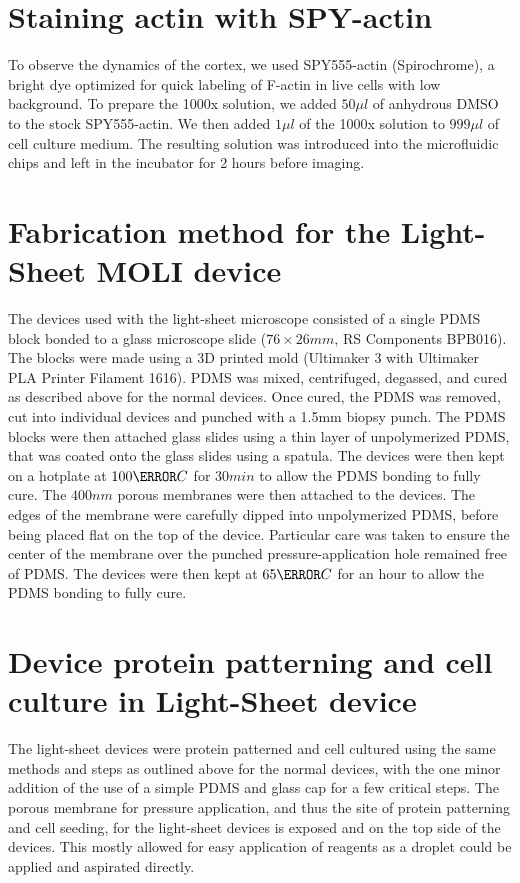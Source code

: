 \section{Staining actin with SPY-actin}

To observe the dynamics of the cortex, we used SPY555-actin (Spirochrome), a bright dye optimized for quick labeling of F-actin in live cells with low background. To prepare the 1000x solution, we added  $50\mu l$ of anhydrous DMSO to the stock SPY555-actin. We then added $1 \mu l$ of the 1000x solution to $999\mu l$ of cell culture medium. The resulting solution was introduced into the microfluidic chips and left in the incubator for 2 hours before imaging.

\section{Fabrication method for the Light-Sheet MOLI device }

The devices used with the light-sheet microscope consisted of a single PDMS block bonded to a glass microscope slide ($76 \times 26 mm$, RS Components BPB016). The blocks were made using a 3D printed mold (Ultimaker 3 with Ultimaker PLA Printer Filament 1616). PDMS was mixed, centrifuged, degassed, and cured as described above for the normal devices. Once cured, the PDMS was removed, cut into individual devices and punched with a 1.5mm biopsy punch. The PDMS blocks were then attached glass slides using a thin layer of unpolymerized PDMS, that was coated onto the glass slides using a spatula. The devices were then kept on a hotplate at $100\degree C$ for $30min$ to allow the PDMS bonding to fully cure. The $400nm$ porous membranes were then attached to the devices. The edges of the membrane were carefully dipped into unpolymerized PDMS, before being placed flat on the top of the device. Particular care was taken to ensure the center of the membrane over the punched pressure-application hole remained free of PDMS. The devices were then kept at $65\degree C$ for an hour to allow the PDMS bonding to fully cure.

\section{Device protein patterning and cell culture in Light-Sheet device}

The light-sheet devices were protein patterned and cell cultured using the same methods and steps as outlined above for the normal devices, with the one minor addition of the use of a simple PDMS and glass cap for a few critical steps. The porous membrane for pressure application, and thus the site of protein patterning and cell seeding, for the light-sheet devices is exposed and on the top side of the devices. This mostly allowed for easy application of reagents as a droplet could be applied and aspirated directly. 

